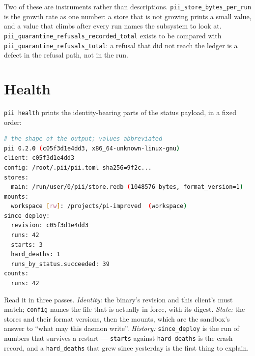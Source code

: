 Two of these are instruments rather than descriptions. \texttt{pii\_store\_bytes\_per\_run} is
the growth rate as one number: a store that is not growing prints a small value, and a value
that climbs after every run names the subsystem to look at.
\texttt{pii\_quarantine\_refusals\_recorded\_total} exists to be compared with
\texttt{pii\_quarantine\_refusals\_total}: a refusal that did not reach the ledger is a defect
in the refusal path, not in the run.

\section{Health}

\texttt{pii health} prints the identity-bearing parts of the status payload, in a fixed order:

\begin{lstlisting}[language=bash]
# the shape of the output; values abbreviated
pii 0.2.0 (c05f3d1e4dd3, x86_64-unknown-linux-gnu)
client: c05f3d1e4dd3
config: /root/.pii/pii.toml sha256=9f2c...
stores:
  main: /run/user/0/pii/store.redb (1048576 bytes, format_version=1)
mounts:
  workspace [rw]: /projects/pi-improved  (workspace)
since_deploy:
  revision: c05f3d1e4dd3
  runs: 42
  starts: 3
  hard_deaths: 1
  runs_by_status.succeeded: 39
counts:
  runs: 42
\end{lstlisting}

Read it in three passes. \emph{Identity:} the binary's revision and this client's must match;
\texttt{config} names the file that is actually in force, with its digest. \emph{State:} the
stores and their format versions, then the mounts, which are the sandbox's answer to
\enquote{what may this daemon write}. \emph{History:} \texttt{since\_deploy} is the run of
numbers that survives a restart --- \texttt{starts} against \texttt{hard\_deaths} is the
crash record, and a \texttt{hard\_deaths} that grew since yesterday is the first thing to
explain.

